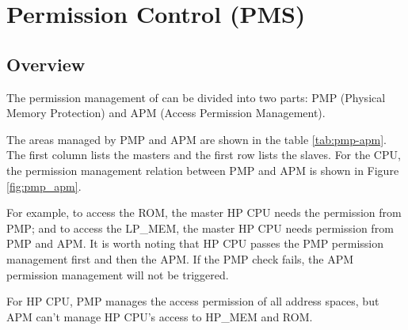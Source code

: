 \documentclass[main\_\_EN.tex]{subfiles}
\begin{document}

\ifglobal
\else
    {\let\clearpage\relax \listoftodos}
    {\let\clearpage\relax \listofdonetodos}
    \tableofcontents
\fi




\hypertarget{permctrl}{}
\chapter{Permission Control (PMS)}
\label{mod:permctrl}

\section{Overview}

The permission management of \chipname{} can be divided into two parts: PMP (Physical Memory Protection) and APM (Access Permission Management).

The areas managed by PMP and APM are shown in the table \ref{tab:pmp-apm}. The first column lists the masters and the first row lists the slaves. For the CPU, the permission management relation between PMP and APM is shown in Figure \ref{fig:pmp_apm}.

For example, to access the ROM, the master HP CPU needs the permission from PMP; and to access the LP\_MEM, the master HP CPU needs permission from PMP and APM. It is worth noting that HP CPU passes the PMP permission management first and then the APM. If the PMP check fails, the APM permission management will not be triggered.

For HP CPU, PMP manages the access permission of all address spaces, but APM can't manage HP CPU's access to HP\_MEM and ROM.
\end{document}
